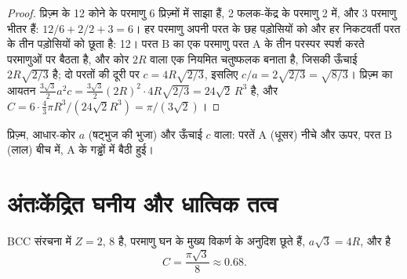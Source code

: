 \begin{proof}
प्रिज़्म के 12 कोने के परमाणु 6 प्रिज़्मों में साझा हैं, 2 फलक-केंद्र के परमाणु
2 में, और 3 परमाणु भीतर हैं: $12/6 + 2/2 + 3 = 6$। हर परमाणु अपनी परत के
छह पड़ोसियों को और हर निकटवर्ती परत के तीन पड़ोसियों को छूता है: 12। परत B का
एक परमाणु परत A के तीन परस्पर स्पर्श करते परमाणुओं पर बैठता है, और कोर $2R$ वाला
एक नियमित चतुष्फलक बनाता है, जिसकी ऊँचाई $2R\sqrt{2/3}$ है; दो परतों
की दूरी पर $c = 4R\sqrt{2/3}$, इसलिए $c/a = 2\sqrt{2/3} = \sqrt{8/3}$। प्रिज़्म का
आयतन $\frac{3\sqrt3}{2}a^2 c = \frac{3\sqrt3}{2}(2R)^2 \cdot
4R\sqrt{2/3} = 24\sqrt2\,R^3$ है, और $C = 6 \cdot \frac43\pi R^3/(24\sqrt2
R^3) = \pi/(3\sqrt2)$।
\end{proof}

\begin{omfigure}

{\small {} प्रिज़्म, आधार-कोर $a$ (षट्भुज की
भुजा) और ऊँचाई $c$ वाला: परतें A (धूसर) नीचे और ऊपर,
परत B (लाल) बीच में, A के गड्ढों में बैठी हुई।}
\end{omfigure}

\section{अंतःकेंद्रित घनीय और धात्विक तत्व}

\begin{proposition}[अंतःकेंद्रित घनीय]\label{prop:b1:crystals-metals:bcc}
BCC संरचना में $Z = 2$,  8 है, परमाणु
घन के मुख्य विकर्ण के अनुदिश छूते हैं, $a\sqrt3 = 4R$, और
 है
\[
  C = \frac{\pi\sqrt3}{8} \approx 0.68 .
\]
\end{proposition}

